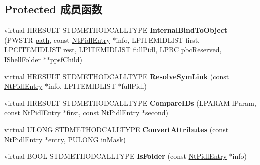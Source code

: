 \subsection*{Protected 成员函数}
\begin{DoxyCompactItemize}
\item 
\mbox{\label{class_c_nt_object_folder_ac48d7584541ea412c904559bd6aeb13f}} 
virtual H\+R\+E\+S\+U\+LT S\+T\+D\+M\+E\+T\+H\+O\+D\+C\+A\+L\+L\+T\+Y\+PE {\bfseries Internal\+Bind\+To\+Object} (P\+W\+S\+TR \hyperlink{structpath}{path}, const \hyperlink{struct_nt_pidl_entry}{Nt\+Pidl\+Entry} $\ast$info, L\+P\+I\+T\+E\+M\+I\+D\+L\+I\+ST first, L\+P\+C\+I\+T\+E\+M\+I\+D\+L\+I\+ST rest, L\+P\+I\+T\+E\+M\+I\+D\+L\+I\+ST full\+Pidl, L\+P\+BC pbc\+Reserved, \hyperlink{interface_i_shell_folder}{I\+Shell\+Folder} $\ast$$\ast$ppsf\+Child)
\item 
\mbox{\label{class_c_nt_object_folder_aebd778a2ebe536d9bd3abcee0bd6ce86}} 
virtual H\+R\+E\+S\+U\+LT S\+T\+D\+M\+E\+T\+H\+O\+D\+C\+A\+L\+L\+T\+Y\+PE {\bfseries Resolve\+Sym\+Link} (const \hyperlink{struct_nt_pidl_entry}{Nt\+Pidl\+Entry} $\ast$info, L\+P\+I\+T\+E\+M\+I\+D\+L\+I\+ST $\ast$full\+Pidl)
\item 
\mbox{\label{class_c_nt_object_folder_a6b5ae57d7a2174c057db6909878b099b}} 
virtual H\+R\+E\+S\+U\+LT S\+T\+D\+M\+E\+T\+H\+O\+D\+C\+A\+L\+L\+T\+Y\+PE {\bfseries Compare\+I\+Ds} (L\+P\+A\+R\+AM l\+Param, const \hyperlink{struct_nt_pidl_entry}{Nt\+Pidl\+Entry} $\ast$first, const \hyperlink{struct_nt_pidl_entry}{Nt\+Pidl\+Entry} $\ast$second)
\item 
\mbox{\label{class_c_nt_object_folder_a20f1f2c47abce23c6deca78a4ea52bbe}} 
virtual U\+L\+O\+NG S\+T\+D\+M\+E\+T\+H\+O\+D\+C\+A\+L\+L\+T\+Y\+PE {\bfseries Convert\+Attributes} (const \hyperlink{struct_nt_pidl_entry}{Nt\+Pidl\+Entry} $\ast$entry, P\+U\+L\+O\+NG in\+Mask)
\item 
\mbox{\label{class_c_nt_object_folder_af88cc86fe1d91d6d08d2650a14fcaaad}} 
virtual B\+O\+OL S\+T\+D\+M\+E\+T\+H\+O\+D\+C\+A\+L\+L\+T\+Y\+PE {\bfseries Is\+Folder} (const \hyperlink{struct_nt_pidl_entry}{Nt\+Pidl\+Entry} $\ast$info)
\item 
\mbox{\label{class_c_nt_object_folder_a2a6b1245ac46ac668a67b50b22a7d49d}} 
$$
\end{DoxyCompactItemize}
